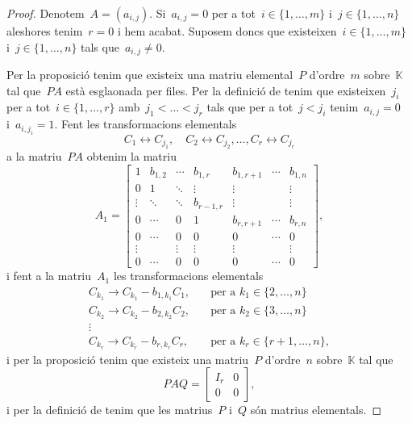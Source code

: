 \documentclass[../../main.tex]{subfiles}
\begin{document}
    \begin{proof}
        Denotem~\(A=(a_{i,j})\).
        Si~\(a_{i,j}=0\) per a tot~\(i\in\{1,\dots,m\}\) i~\(j\in\{1,\dots,n\}\) aleshores tenim~\(r=0\) i hem acabat.
        Suposem doncs que existeixen~\(i\in\{1,\dots,m\}\) i~\(j\in\{1,\dots,n\}\) tals que~\(a_{i,j}\neq0\).

        Per la proposició  tenim que existeix una matriu elemental~\(P\) d'ordre~\(m\) sobre~\(\mathbb{K}\) tal que~\(PA\) està esglaonada per files.
        Per la definició de  tenim que existeixen~\(j_{i}\) per a tot~\(i\in\{1,\dots,r\}\) amb~\(j_{1}<\dots<j_{r}\) tals que per a tot~\(j<j_{i}\) tenim~\(a_{i,j}=0\) i~\(a_{i,j_{i}}=1\).
        Fent les transformacions elementals
        \[
            C_{1}\leftrightarrow C_{j_{1}},\quad C_{2}\leftrightarrow C_{j_{2}},\dots,C_{r}\leftrightarrow C_{j_{r}}
        \]
        a la matriu~\(PA\) obtenim la matriu
        \[A_{1}=\left[\begin{array}{cccc|ccc}
        1 & b_{1,2} & \cdots & b_{1,r} & b_{1,r+1} & \cdots & b_{1,n} \\
        0 & 1 & \ddots & \vdots & \vdots & & \vdots\\
        \vdots & \ddots & \ddots & b_{r-1,r} & \vdots & & \vdots \\
        0 & \cdots & 0 & 1 & b_{r,r+1} & \cdots & b_{r,n} \\\hline
        0 & \cdots & 0 & 0 & 0 & \cdots & 0 \\
        \vdots & & \vdots & \vdots & \vdots & & \vdots \\
        0 & \cdots & 0 & 0 & 0 & \cdots & 0
        \end{array}\right],\]
        i fent a la matriu~\(A_{1}\) les transformacions elementals
        \begin{align*}
        C_{k_{1}}\rightarrow C_{k_{1}}-b_{1,k_{1}}C_{1},\quad&\text{per a }k_{1}\in\{2,\dots,n\} \\
        C_{k_{2}}\rightarrow C_{k_{2}}-b_{2,k_{2}}C_{2},\quad&\text{per a }k_{2}\in\{3,\dots,n\} \\
        \vdots & \\
        C_{k_{r}}\rightarrow C_{k_{r}}-b_{r,k_{r}}C_{r},\quad&\text{per a }k_{r}\in\{r+1,\dots,n\},
        \end{align*}
        i per la proposició  tenim que existeix una matriu~\(P\) d'ordre~\(n\) sobre~\(\mathbb{K}\) tal que
        \[PAQ=\left[\begin{array}{c|c}
        I_{r} & 0\\\hline
        0 & 0
        \end{array}\right],\]
        i per la definició de  tenim que les matrius~\(P\) i~\(Q\) són matrius elementals.


\end{proof}
\end{document}
